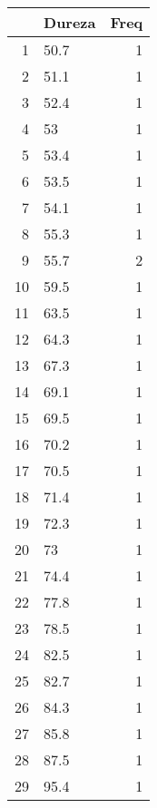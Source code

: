 \begin{table}[ht]
\centering
\begin{tabular}{rlr}
  \hline
 & Dureza & Freq \\ 
  \hline
1 & 50.7 &   1 \\ 
  2 & 51.1 &   1 \\ 
  3 & 52.4 &   1 \\ 
  4 & 53 &   1 \\ 
  5 & 53.4 &   1 \\ 
  6 & 53.5 &   1 \\ 
  7 & 54.1 &   1 \\ 
  8 & 55.3 &   1 \\ 
  9 & 55.7 &   2 \\ 
  10 & 59.5 &   1 \\ 
  11 & 63.5 &   1 \\ 
  12 & 64.3 &   1 \\ 
  13 & 67.3 &   1 \\ 
  14 & 69.1 &   1 \\ 
  15 & 69.5 &   1 \\ 
  16 & 70.2 &   1 \\ 
  17 & 70.5 &   1 \\ 
  18 & 71.4 &   1 \\ 
  19 & 72.3 &   1 \\ 
  20 & 73 &   1 \\ 
  21 & 74.4 &   1 \\ 
  22 & 77.8 &   1 \\ 
  23 & 78.5 &   1 \\ 
  24 & 82.5 &   1 \\ 
  25 & 82.7 &   1 \\ 
  26 & 84.3 &   1 \\ 
  27 & 85.8 &   1 \\ 
  28 & 87.5 &   1 \\ 
  29 & 95.4 &   1 \\ 
   \hline
\end{tabular}
\end{table}
